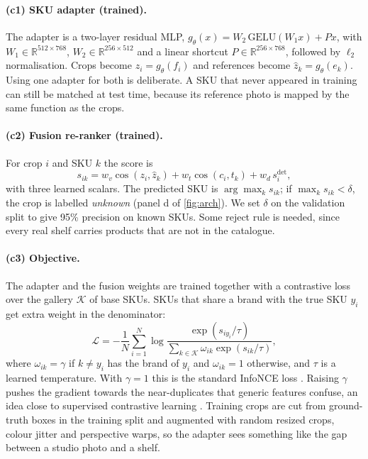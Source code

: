 \paragraph{(c1) SKU adapter (trained).}
The adapter is a two-layer residual MLP, $g_\theta(x)=W_2\,\mathrm{GELU}(W_1x)+Px$, with $W_1\in\mathbb{R}^{512\times768}$, $W_2\in\mathbb{R}^{256\times512}$ and a linear shortcut $P\in\mathbb{R}^{256\times768}$, followed by $\ell_2$ normalisation. Crops become $z_i=g_\theta(f_i)$ and references become $\hat z_k=g_\theta(e_k)$. Using one adapter for both is deliberate. A SKU that never appeared in training can still be matched at test time, because its reference photo is mapped by the same function as the crops.

\paragraph{(c2) Fusion re-ranker (trained).}
For crop $i$ and SKU $k$ the score is
\begin{equation}
  s_{ik} = w_v \cos(z_i,\hat z_k) + w_t \cos(c_i,t_k) + w_d\, s^{\mathrm{det}}_i ,
  \label{eq:score}
\end{equation}
with three learned scalars. The predicted SKU is $\arg\max_k s_{ik}$; if $\max_k s_{ik}<\delta$, the crop is labelled \emph{unknown} (panel d of \cref{fig:arch}). We set $\delta$ on the validation split to give 95\% precision on known SKUs. Some reject rule is needed, since every real shelf carries products that are not in the catalogue.

\paragraph{(c3) Objective.}
The adapter and the fusion weights are trained together with a contrastive loss over the gallery $\mathcal{K}$ of base SKUs. SKUs that share a brand with the true SKU $y_i$ get extra weight in the denominator:
\begin{equation}
  \mathcal{L} = -\frac{1}{N}\sum_{i=1}^{N}\log\frac{\exp(s_{iy_i}/\tau)}{\sum_{k\in\mathcal{K}}\omega_{ik}\exp(s_{ik}/\tau)} ,
  \label{eq:loss}
\end{equation}
where $\omega_{ik}=\gamma$ if $k\neq y_i$ has the brand of $y_i$ and $\omega_{ik}=1$ otherwise, and $\tau$ is a learned temperature. With $\gamma=1$ this is the standard InfoNCE loss \cite{oord2018cpc}. Raising $\gamma$ pushes the gradient towards the near-duplicates that generic features confuse, an idea close to supervised contrastive learning \cite{khosla2020supcon}. Training crops are cut from ground-truth boxes in the training split and augmented with random resized crops, colour jitter and perspective warps, so the adapter sees something like the gap between a studio photo and a shelf.

